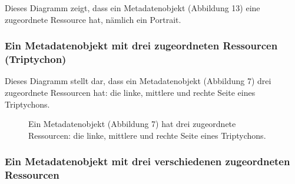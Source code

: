 \documentclass[
  letterpaper,
  DIV=11,
  numbers=noendperiod]{scrartcl}
\begin{document}
Dieses Diagramm zeigt, dass ein Metadatenobjekt (Abbildung 13) eine
zugeordnete Ressource hat, nämlich ein Portrait.

\subsubsection{Ein Metadatenobjekt mit drei zugeordneten Ressourcen
(Triptychon)}\label{ein-metadatenobjekt-mit-drei-zugeordneten-ressourcen-triptychon}

Dieses Diagramm stellt dar, dass ein Metadatenobjekt (Abbildung 7) drei
zugeordnete Ressourcen hat: die linke, mittlere und rechte Seite eines
Triptychons.

\begin{figure}


\caption{\label{fig-metadata-2}Ein Metadatenobjekt (Abbildung 7) hat
drei zugeordnete Ressourcen: die linke, mittlere und rechte Seite eines
Triptychons.}

\end{figure}%

\subsubsection{Ein Metadatenobjekt mit drei verschiedenen zugeordneten
Ressourcen}\label{ein-metadatenobjekt-mit-drei-verschiedenen-zugeordneten-ressourcen}
\end{document}
